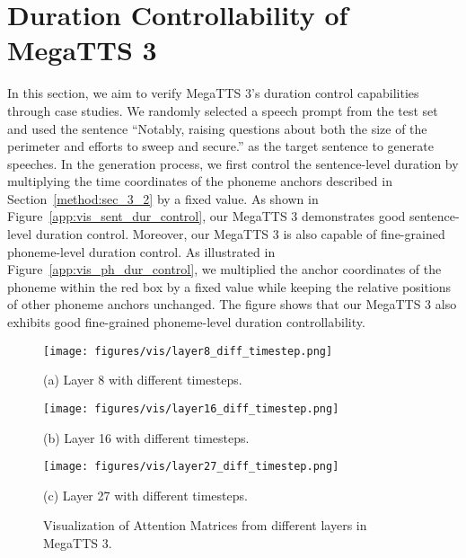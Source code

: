 \section{Duration Controllability of MegaTTS 3}
\label{app:dur_contol}
In this section, we aim to verify MegaTTS 3's duration control capabilities through case studies. We randomly selected a speech prompt from the test set and used the sentence ``Notably, raising questions about both the size of the perimeter and efforts to sweep and secure.'' as the target sentence to generate speeches. In the generation process, we first control the sentence-level duration by multiplying the time coordinates of the phoneme anchors described in Section~\ref{method:sec_3_2} by a fixed value. As shown in Figure~\ref{app:vis_sent_dur_control}, our MegaTTS 3 demonstrates good sentence-level duration control. Moreover, our MegaTTS 3 is also capable of fine-grained phoneme-level duration control. As illustrated in Figure~\ref{app:vis_ph_dur_control}, we multiplied the anchor coordinates of the phoneme within the red box by a fixed value while keeping the relative positions of other phoneme anchors unchanged. The figure shows that our MegaTTS 3 also exhibits good fine-grained phoneme-level duration controllability.




\begin{figure*}[!ht]
\centering
\begin{minipage}{0.98\linewidth}
    \centering
\texttt{[image: figures/vis/layer8\_diff\_timestep.png]}
    \caption*{(a) Layer 8 with different timesteps.}
\end{minipage}
\begin{minipage}{0.98\linewidth}
    \centering
\texttt{[image: figures/vis/layer16\_diff\_timestep.png]}
    \caption*{(b) Layer 16 with different timesteps.}
\end{minipage}
\begin{minipage}{0.98\linewidth}
    \centering
\texttt{[image: figures/vis/layer27\_diff\_timestep.png]}
    \caption*{(c) Layer 27 with different timesteps.}
\end{minipage}
\centering
\caption{Visualization of Attention Matrices from different layers in MegaTTS 3.}
\label{app:vis_attn}
\end{figure*}



